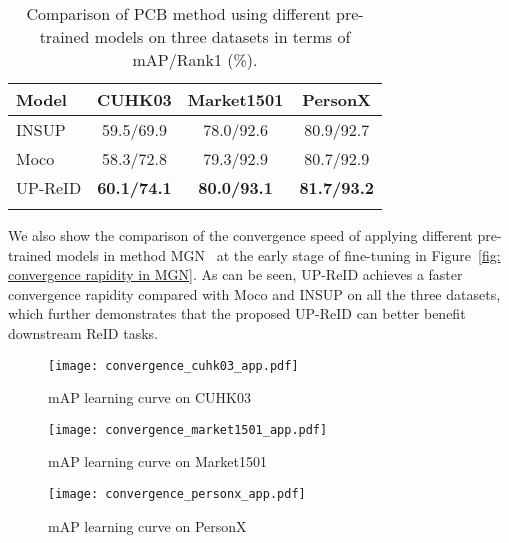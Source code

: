 \documentclass[10pt,twocolumn,letterpaper]{article}
\begin{document}
\begin{table}[h!]
	\centering
	\caption{Comparison of PCB method using different pre-trained models on three datasets in terms of mAP/Rank1 (\%).}
	\begin{tabular}{l|ccc}
		\shline
		Model & CUHK03 & Market1501 & PersonX \\
		\hline
		INSUP    & 59.5/69.9 & 78.0/92.6 & 80.9/92.7 \\ \hline
		Moco  & 58.3/72.8 & 79.3/92.9 & 80.7/92.9 \\ \hline
		UP-ReID & \textbf{60.1/74.1} & \textbf{80.0/93.1} & \textbf{81.7/93.2} \\ \shline
	\end{tabular}
	\label{tab:comparison on PCB}
\end{table}

We also show the comparison of the convergence speed of applying different pre-trained models in method MGN~\cite{wang2018learning} at the early stage of fine-tuning in Figure~\ref{fig: convergence rapidity in MGN}. As can be seen, UP-ReID achieves a faster convergence rapidity compared with Moco and INSUP on all the three datasets, which further demonstrates that the proposed UP-ReID can better benefit downstream ReID tasks.


\begin{figure*}[t!]
	\centering
	\begin{subfigure}{0.33\linewidth}
		\texttt{[image: convergence\_cuhk03\_app.pdf]}
		\caption{mAP learning curve on CUHK03}
		\label{subfig: convergence on cuhk03}
	\end{subfigure}
	\begin{subfigure}{0.33\linewidth}
		\texttt{[image: convergence\_market1501\_app.pdf]}
		\caption{mAP learning curve on Market1501}
		\label{subfig: convergence on market1501}
	\end{subfigure}
	\begin{subfigure}{0.33\linewidth}
		\texttt{[image: convergence\_personx\_app.pdf]}
		\caption{mAP learning curve on PersonX}
		\label{subfig: convergence on personx}
	\end{subfigure}
	\vspace{-2mm}
	\caption{mAP learning curves of different pre-trained models in MGN~\cite{wang2018learning} on three datasets (CUHK03, Market1501, and PersonX) with the same training schedule.}
	\label{fig: convergence rapidity in MGN}
\end{figure*}
\end{document}
